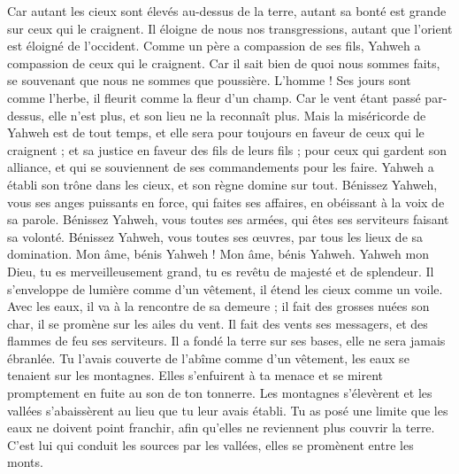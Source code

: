 \begin{multicols}{2}
Car autant les cieux sont élevés au-dessus de la terre, autant sa bonté est grande sur ceux qui le craignent.
Il éloigne de nous nos transgressions, autant que l'orient est éloigné de l'occident.
Comme un père a compassion de ses fils, Yahweh a compassion de ceux qui le craignent.
Car il sait bien de quoi nous sommes faits, se souvenant que nous ne sommes que poussière.
L’homme ! Ses jours sont comme l’herbe, il fleurit comme la fleur d'un champ.
Car le vent étant passé par-dessus, elle n'est plus, et son lieu ne la reconnaît plus.
Mais la miséricorde de Yahweh est de tout temps, et elle sera pour toujours en faveur de ceux qui le craignent ; et sa justice en faveur des fils de leurs fils ;
pour ceux qui gardent son alliance, et qui se souviennent de ses commandements pour les faire.
Yahweh a établi son trône dans les cieux, et son règne domine sur tout.
Bénissez Yahweh, vous ses anges puissants en force, qui faites ses affaires, en obéissant à la voix de sa parole.
Bénissez Yahweh, vous toutes ses armées, qui êtes ses serviteurs faisant sa volonté.
Bénissez Yahweh, vous toutes ses œuvres, par tous les lieux de sa domination. Mon âme, bénis Yahweh !
\VerseOne{}Mon âme, bénis Yahweh. Yahweh mon Dieu, tu es merveilleusement grand, tu es revêtu de majesté et de splendeur.
Il s'enveloppe de lumière comme d'un vêtement, il étend les cieux comme un voile.
Avec les eaux, il va à la rencontre de sa demeure ; il fait des grosses nuées son char, il se promène sur les ailes du vent.
Il fait des vents ses messagers, et des flammes de feu ses serviteurs.
Il a fondé la terre sur ses bases, elle ne sera jamais ébranlée.
Tu l'avais couverte de l'abîme comme d'un vêtement, les eaux se tenaient sur les montagnes.
Elles s'enfuirent à ta menace et se mirent promptement en fuite au son de ton tonnerre.
Les montagnes s'élevèrent et les vallées s'abaissèrent au lieu que tu leur avais établi.
Tu as posé une limite que les eaux ne doivent point franchir, afin qu’elles ne reviennent plus couvrir la terre.
C'est lui qui conduit les sources par les vallées, elles se promènent entre les monts.

\end{multicols}

